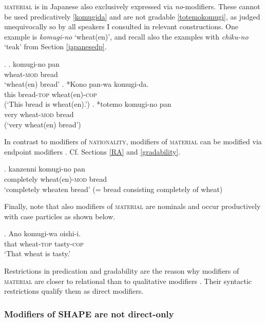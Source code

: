 \textsc{material} is in Japanese also exclusively expressed via \textit{no}-modifiers. These cannot be used predicatively \ref{komugida} and are not gradable \ref{totemokomugi}, as judged unequivocally so by all speakers I consulted in relevant constructions. One example is \textit{komugi-no} `wheat(en)’, and recall also the examples with \textit{chīku-no} `teak’ from Section \ref{japanesedp}. 

\ex. \ag. komugi-no pan\\
wheat-\textsc{mod} bread\\
`wheat(en) bread'
\bg. *Kono pan-wa komugi-da.\\
this bread-\textsc{top} wheat(en)-\textsc{cop}\\
(`This bread is wheat(en).’) \label{komugida}
\cg. *totemo komugi-no pan\\
very wheat-\textsc{mod} bread\\
(`very wheat(en) bread’) \label{totemokomugi}

In contrast to modifiers of \textsc{nationality}, modifiers of \textsc{material} can be modified via endpoint modifiers \citep{kennedy:2005:scale, fabregas:2014:adjectival, oshima:2019:gradability}. Cf. Sections \ref{RA} and \ref{gradability}. 

\exg. kanzenni komugi-no pan\\
completely wheat(en)-\textsc{mod} bread\\
`completely wheaten bread’ (= bread consisting completely of wheat)

Finally, note that also modifiers of \textsc{material} are nominals and occur productively with case particles as shown below.

\exg. Ano komugi-wa oishi-i.\\
that wheat-\textsc{top} tasty-\textsc{cop}\\
`That wheat is tasty.’

Restrictions in predication and gradability are the reason why modifiers of \textsc{material} are closer to relational than to qualitative modifiers \citep{nagano:2016:are, morita:2011:three}. Their syntactic restrictions qualify them as direct modifiers.

\subsubsection{Modifiers of SHAPE are not direct-only}

